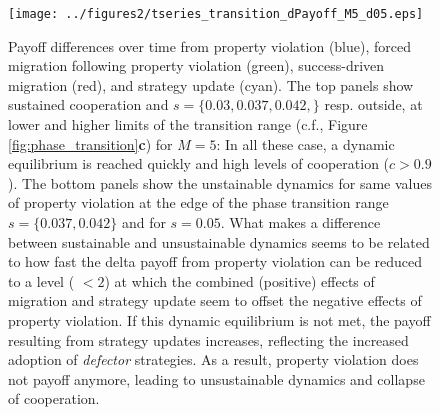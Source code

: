 \begin{figure}[h]
\begin{center}
\centerline{\texttt{[image: ../figures2/tseries\_transition\_dPayoff\_M5\_d05.eps]}}
\caption{Payoff differences over time from property violation (blue), forced migration following property violation (green), success-driven migration (red), and strategy update (cyan). The top panels show sustained cooperation and $s = \{0.03,0.037,0.042,\}$ resp. outside, at lower and higher limits of the transition range (c.f., Figure \ref{fig:phase_transition}{\bf c}) for $M=5$: In all these case, a dynamic equilibrium is reached quickly and high levels of cooperation ($c > 0.9$). The bottom panels show the unstainable dynamics for same values of property violation at the edge of the phase transition range $s = \{0.037,0.042\}$ and for $s = 0.05$. What makes a difference between sustainable and unsustainable dynamics seems to be related to how fast the delta payoff from property violation can be reduced to a level ( $<2$) at which the combined (positive) effects of migration and strategy update seem to offset the negative effects of property violation. If this dynamic equilibrium is not met, the payoff resulting from strategy updates increases, reflecting the increased adoption of {\it defector} strategies. As a result, property violation does not payoff anymore, leading to unsustainable dynamics and collapse of cooperation.}
\label{fig:tseries}
\end{center}
\end{figure}


